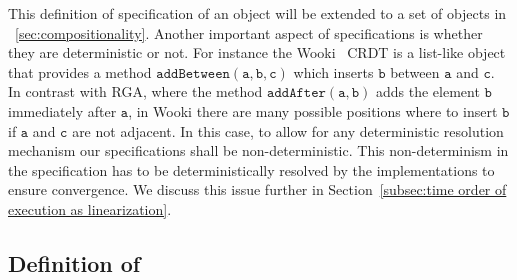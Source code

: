 This definition of specification of an object will be extended to a
set of objects in \sectionautorefname~\ref{sec:compositionality}.
%
Another important aspect of specifications is whether they are
deterministic or not.
%
For instance the Wooki~\cite{DBLP:conf/icdcs/PreguicaMSL09} CRDT is a
list-like object that provides a method $\mathtt{addBetween(a, b, c)}$
which inserts $\mathtt{b}$ between $\mathtt{a}$ and $\mathtt{c}$.
%
In contrast with RGA, where the method $\mathtt{addAfter(a, b)}$
adds the element $\mathtt{b}$ immediately after $\mathtt{a}$, in Wooki
there are many possible positions where to insert $\mathtt{b}$ if $\mathtt{a}$ and $\mathtt{c}$ are not
adjacent.
%
In this case, to allow for any deterministic resolution mechanism our
specifications shall be non-deterministic.
%
This non-determinism in the specification has to be deterministically
resolved by the implementations to ensure convergence.
We discuss this issue further in Section~\ref{subsec:time order of execution as linearization}.
%



\subsection{Definition of \CRDTLin{}}
\label{subsec:definition of distributed linearizability}

